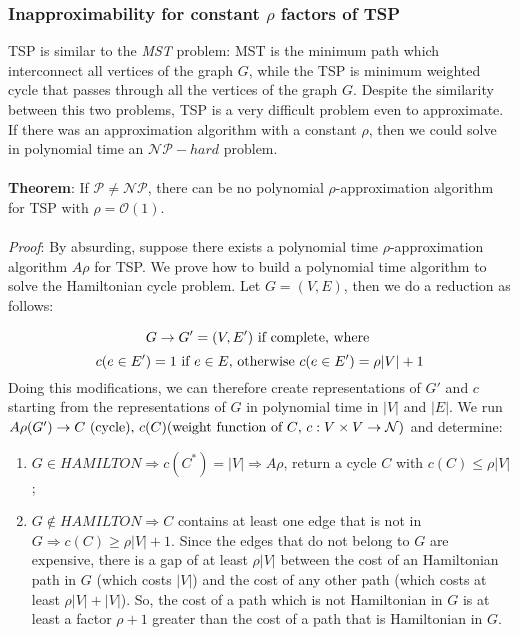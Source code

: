 \subsubsection{Inapproximability for constant $\rho$ factors of TSP}

TSP is similar to the \textit{MST} problem: MST is the minimum path which interconnect all vertices of the graph $G$, while the TSP is minimum weighted cycle that passes through all the vertices of the graph $G$. Despite the similarity between this two problems, TSP is a very difficult problem even to approximate. If there was an approximation algorithm with a constant $\rho$, then we could solve in polynomial time an $\mathcal{NP}-hard$ problem.\\
\\
\noindent
\textbf{Theorem}: If $\mathcal{P} \ne \mathcal{NP}$, there can be no polynomial $\rho$-approximation algorithm for TSP with $\rho = \mathcal{O}(1)$.\\
\\
\noindent
\textit{Proof}: By absurding, suppose there exists a polynomial time $\rho$-approximation algorithm $A\rho$ for TSP. We prove how to build a polynomial time algorithm to solve the Hamiltonian cycle problem. Let $G = (V, E)$, then we do a reduction as follows:

\[
    G \rightarrow G' = (V, E') \textnormal{ if complete, where }
\]
\[
    c(e \in E') = 1 \textnormal{ if } e \in E \textnormal{, otherwise } c(e \in E') = \rho|V| + 1
\]
Doing this modifications, we can therefore create representations of $G'$ and $c$ starting from the representations of $G$ in polynomial time in $|V|$ and $|E|$.
We run $A\rho(G') \rightarrow C \textnormal{ (cycle), } c(C) \textnormal{(weight function of $C$, $c: V \times V \rightarrow \mathcal{N}$)}$ and determine:
\begin{enumerate}
    \item $G \in HAMILTON \Rightarrow c(C^*) = |V| \Rightarrow A\rho$, return a cycle $C$ with $c(C) \le \rho|V|$;
    \item $G \not\in HAMILTON \Rightarrow C$ contains at least one edge that is not in $G \Rightarrow c(C) \ge \rho|V| + 1$. Since the edges that do not belong to $G$ are expensive, there is a gap of at least $\rho |V|$ between the cost of an Hamiltonian path in $G$ (which costs $|V|$) and the cost of any other path (which costs at least $\rho |V| + |V|$). So, the cost of a path which is not Hamiltonian in $G$ is at least a factor $\rho + 1$ greater than the cost of a path that is Hamiltonian in $G$.
\end{enumerate}

